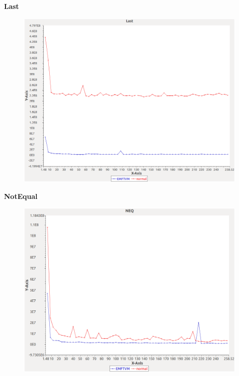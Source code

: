 \noindent\textbf{Last}

\begin{figure}[h]
\centering
\includegraphics[width=\textwidth]{../graphs/sequence/Last}
\end{figure}
\pagebreak

\noindent\textbf{NotEqual}

\begin{figure}[h]
\centering
\includegraphics[width=\textwidth]{../graphs/sequence/NEQ}
\end{figure}
\pagebreak

